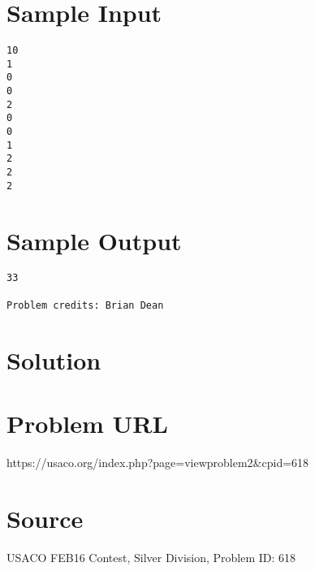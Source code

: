 \documentclass[12pt]{article}
\begin{document}
\section*{Sample Input}
\begin{verbatim}
10
1
0
0
2
0
0
1
2
2
2
\end{verbatim}

\section*{Sample Output}
\begin{verbatim}
33

Problem credits: Brian Dean
\end{verbatim}

\section*{Solution}


\section*{Problem URL}
https://usaco.org/index.php?page=viewproblem2&cpid=618

\section*{Source}
USACO FEB16 Contest, Silver Division, Problem ID: 618
\end{document}
